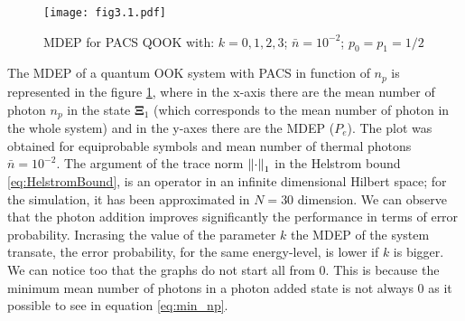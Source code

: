     \begin{figure}[tbp]
        \begin{center}
            \texttt{[image: fig3.1.pdf]}
            \caption{MDEP for PACS QOOK with: $k=0,1,2,3$; $\bar{n}=10^{-2}$; $p_0=p_1=1/2$}
            \label{fig:3.1}
        \end{center}
    \end{figure}
    The MDEP of a quantum OOK system with PACS in function of $n_p$ is represented in the figure
    \ref{fig:3.1}, where in the x-axis there are the mean number of photon $n_p$ in the state 
    $\pmb{\Xi}_1$ (which corresponds to the mean number of photon in the whole system) and in the 
    y-axes there are the MDEP ($P_e$). The plot was obtained for equiprobable symbols and 
    mean number of thermal photons $\bar{n}=10^{-2}$.  
    The argument of the trace norm $\norm{\cdot}_1$ in the Helstrom bound 
    \ref{eq:HelstromBound}, is an operator in an infinite dimensional Hilbert space; for the 
    simulation, it has been approximated in $N=30$ dimension.
    We can observe that the photon addition improves significantly the performance in terms
    of error probability. Incrasing the value of the parameter $k$ the MDEP of the system 
    transate, the error probability, for the same energy-level, is lower if $k$ is bigger.
    We can notice too that the graphs do not start all from $0$. This is because the minimum
    mean number of photons in a photon added state is not always $0$ as it possible to see in 
    equation \ref{eq:min_np}.  

